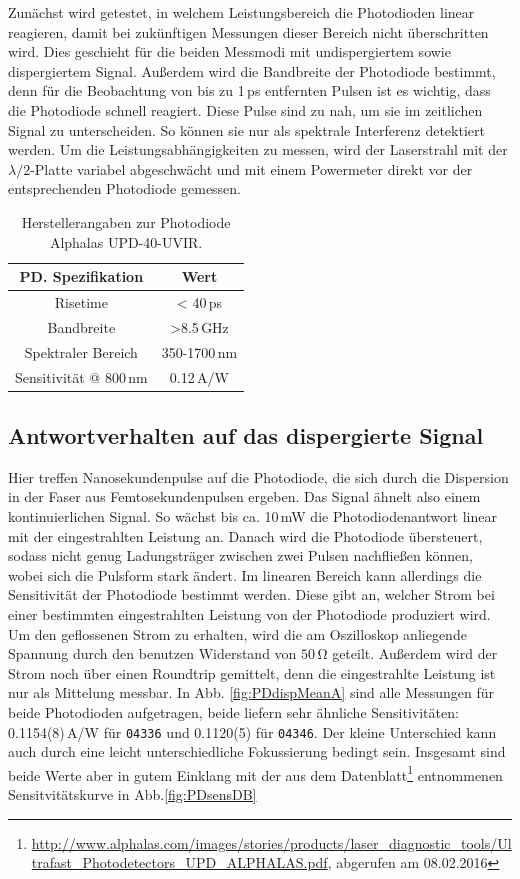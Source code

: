 \documentclass[bachelor,       %
               twoside,        %
               BCOR10mm,       %
               liststotoc,nomtotoc,bibtotoc, %
               english,ngerman, %
               final,          %
               ]{GAUBM}
\begin{document}
Zunächst wird getestet, in welchem Leistungsbereich die Photodioden linear reagieren, damit bei zukünftigen Messungen dieser Bereich nicht überschritten wird.
Dies geschieht für die beiden Messmodi mit undispergiertem sowie dispergiertem Signal.
Außerdem wird die Bandbreite der Photodiode bestimmt, denn für die Beobachtung von bis zu 1\,ps entfernten Pulsen ist es wichtig, dass die Photodiode schnell reagiert.
Diese Pulse sind zu nah, um sie im zeitlichen Signal zu unterscheiden.
So können sie nur als spektrale Interferenz detektiert werden.
Um die Leistungsabhängigkeiten zu messen, wird der Laserstrahl mit der $\lambda/2$-Platte variabel abgeschwächt und mit einem Powermeter direkt vor der entsprechenden Photodiode gemessen.

\begin{table}[!htb]
	\centering
	\begin{tabular}{|c|c|}
		\hline
		PD. Spezifikation & Wert \\		
		\hline
		Risetime & < 40\,ps \\
		Bandbreite & >8.5\,GHz \\
		Spektraler Bereich & 350-1700\,nm \\
		Sensitivität @ 800\,nm & 0.12\,A/W\\
		\hline	
	\end{tabular}
	\caption{Herstellerangaben zur Photodiode Alphalas UPD-40-UVIR.}
	\label{tab:PD}
\end{table}

\subsection{Antwortverhalten auf das dispergierte Signal}
Hier treffen Nanosekundenpulse auf die Photodiode, die sich durch die Dispersion in der Faser aus Femtosekundenpulsen ergeben.
Das Signal ähnelt also einem kontinuierlichen Signal.
So wächst bis ca. 10\,mW die Photodiodenantwort linear mit der eingestrahlten Leistung an.
Danach wird die Photodiode übersteuert, sodass nicht genug Ladungsträger zwischen zwei Pulsen nachfließen können, wobei sich die Pulsform stark ändert.
Im linearen Bereich kann allerdings die Sensitivität der Photodiode bestimmt werden.
Diese gibt an, welcher Strom bei einer bestimmten eingestrahlten Leistung von der Photodiode produziert wird.
Um den geflossenen Strom zu erhalten, wird die am Oszilloskop anliegende Spannung durch den benutzen Widerstand von $50\,\si\ohm$ geteilt.
Außerdem wird der Strom noch über einen Roundtrip gemittelt, denn die eingestrahlte Leistung ist nur als Mittelung messbar.
In Abb. \ref{fig:PDdispMeanA} sind alle Messungen für beide Photodioden aufgetragen, beide liefern sehr ähnliche Sensitivitäten: 0.1154(8)\,A/W für  \texttt{04336} und  0.1120(5) für \texttt{04346}.
Der kleine Unterschied kann auch durch eine leicht unterschiedliche Fokussierung bedingt sein.
Insgesamt sind beide Werte aber in gutem Einklang mit der aus dem Datenblatt\footnote{\url{http://www.alphalas.com/images/stories/products/laser_diagnostic_tools/Ultrafast_Photodetectors_UPD_ALPHALAS.pdf}, abgerufen am 08.02.2016} entnommenen Sensitvitätskurve in Abb.\ref{fig:PDsensDB}
\end{document}
